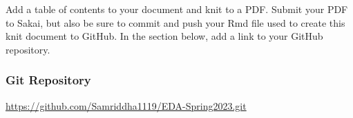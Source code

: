 \documentclass[
]{article}
\begin{document}
Add a table of contents to your document and knit to a PDF. Submit your
PDF to Sakai, but also be sure to commit and push your Rmd file used to
create this knit document to GitHub. In the section below, add a link to
your GitHub repository.

\hypertarget{git-repository}{%
\subsubsection{Git Repository}\label{git-repository}}

\url{https://github.com/Samriddha1119/EDA-Spring2023.git}
\end{document}
